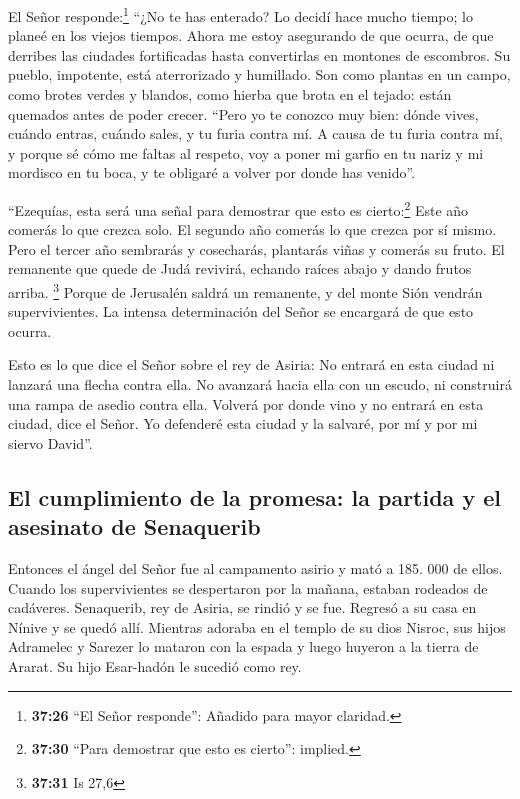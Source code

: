  El Señor responde:\footnote{\textbf{37:26} ``El Señor
  responde'': Añadido para mayor claridad.} ``¿No te has enterado? Lo
decidí hace mucho tiempo; lo planeé en los viejos tiempos. Ahora me
estoy asegurando de que ocurra, de que derribes las ciudades
fortificadas hasta convertirlas en montones de escombros.
 Su pueblo, impotente, está aterrorizado y humillado. Son
como plantas en un campo, como brotes verdes y blandos, como hierba que
brota en el tejado: están quemados antes de poder crecer.
 ``Pero yo te conozco muy bien: dónde vives, cuándo
entras, cuándo sales, y tu furia contra mí.  A causa de
tu furia contra mí, y porque sé cómo me faltas al respeto, voy a poner
mi garfio en tu nariz y mi mordisco en tu boca, y te obligaré a volver
por donde has venido''.

 ``Ezequías, esta será una señal para demostrar que esto
es cierto:\footnote{\textbf{37:30} ``Para demostrar que esto es
  cierto'': implied.} Este año comerás lo que crezca solo. El segundo
año comerás lo que crezca por sí mismo. Pero el tercer año sembrarás y
cosecharás, plantarás viñas y comerás su fruto.  El
remanente que quede de Judá revivirá, echando raíces abajo y dando
frutos arriba. \footnote{\textbf{37:31} Is 27,6}  Porque
de Jerusalén saldrá un remanente, y del monte Sión vendrán
supervivientes. La intensa determinación del Señor se encargará de que
esto ocurra.

 Esto es lo que dice el Señor sobre el rey de Asiria: No
entrará en esta ciudad ni lanzará una flecha contra ella. No avanzará
hacia ella con un escudo, ni construirá una rampa de asedio contra ella.
 Volverá por donde vino y no entrará en esta ciudad, dice
el Señor.  Yo defenderé esta ciudad y la salvaré, por mí
y por mi siervo David''.

\hypertarget{el-cumplimiento-de-la-promesa-la-partida-y-el-asesinato-de-senaquerib}{%
\subsection{El cumplimiento de la promesa: la partida y el asesinato de
Senaquerib}\label{el-cumplimiento-de-la-promesa-la-partida-y-el-asesinato-de-senaquerib}}

 Entonces el ángel del Señor fue al campamento asirio y
mató a 185. 000 de ellos. Cuando los supervivientes se despertaron por
la mañana, estaban rodeados de cadáveres.  Senaquerib,
rey de Asiria, se rindió y se fue. Regresó a su casa en Nínive y se
quedó allí.  Mientras adoraba en el templo de su dios
Nisroc, sus hijos Adramelec y Sarezer lo mataron con la espada y luego
huyeron a la tierra de Ararat. Su hijo Esar-hadón le sucedió como rey.

